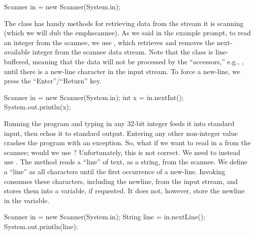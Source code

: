 \begin{verbnobox}[\small]
Scanner in = new Scanner(System.in);
\end{verbnobox}

The  class has handy methods for retrieving data from the stream it is scanning (which we will dub the emph{scannee}). As we said in the example prompt, to read an integer from the scannee, we use , which retrieves and removes the next-available integer from the scannee data stream. Note that the  class is line-buffered, meaning that the data will not be processed by the ``accessors,'' e.g., , until there is a new-line character in the input stream. To force a new-line, we press the ``Enter''/``Return'' key.

\begin{verbnobox}[\small]
Scanner in = new Scanner(System.in);
int x = in.nextInt();
System.out.println(x);
\end{verbnobox}

Running the program and typing in any $32$-bit integer feeds it into standard input, then echos it to standard output. Entering any other non-integer value crashes the program with an  exception. So, what if we want to read in a  from the scannee; would we use ? Unfortunately, this is not correct. We need to instead use . The  method reads a ``line'' of text, as a string, from the scannee. We define a ``line'' as all characters until the first occurrence of a new-line. Invoking  consumes these characters, including the newline, from the input stream, and stores them into a variable, if requested. It does not, however, store the newline in the variable. 

\begin{verbnobox}[\small]
Scanner in = new Scanner(System.in);
String line = in.nextLine();
System.out.println(line);
\end{verbnobox}

